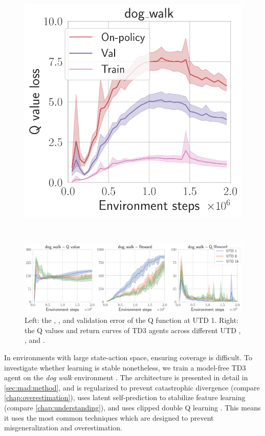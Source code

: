 \begin{figure}[t]
\begin{minipage}{0.25\textwidth}
    \includegraphics[width=\textwidth]{figures/mad-td/critic_loss_dog_walk.pdf}
\end{minipage}
~
\begin{minipage}{0.745\textwidth}
    \includegraphics[width=\textwidth]{figures/mad-td/q_overestimation.pdf}
\end{minipage}
\caption{Left: the , , and  validation error of the Q function at UTD 1. Right: the Q values and return curves of TD3 agents across different UTD , , and .}
\label{fig:mad:q_eval}
\end{figure}

In environments with large state-action space, ensuring coverage is difficult.
To investigate whether learning is stable nonetheless, we train a model-free TD3 agent on the \emph{dog walk} environment \parencite{tunyasuvunakool2020dmcontrol}.
The architecture is presented in detail in \autoref{sec:mad:method}, and is regularized to prevent catastrophic divergence (compare \autoref{chap:overestimation}), uses latent self-prediction to stabilize feature learning (compare \autoref{chap:understanding}), and uses clipped double Q learning \parencite{fujimoto2018addressing}.
This means it uses the most common techniques which are designed to prevent misgeneralization and overestimation.

